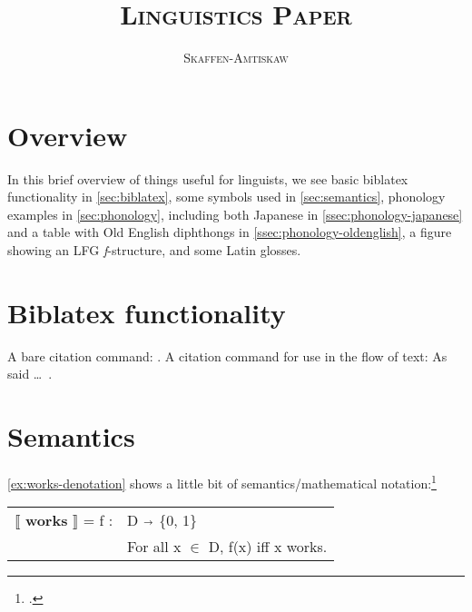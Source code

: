 \documentclass[a4paper,12pt,twoside]{article}
\newcommand{\thistitle}{\textsc{Linguistics Paper}}
\newcommand{\thisauthor}{\textsc{Skaffen-Amtiskaw}}
\begin{document}

\tableofcontents
\thispagestyle{toc}
\newpage

\listoffigures
\thispagestyle{lof}
\newpage

\listoftables
\thispagestyle{lot}
\newpage

\title{\thistitle}
\author{\thisauthor}

\maketitle
\thispagestyle{plain}

\section{Overview}

In this brief overview of things useful for linguists, we see basic biblatex
functionality in \autoref{sec:biblatex}, some symbols used in
\autoref{sec:semantics}, phonology examples in \autoref{sec:phonology},
including both Japanese in \autoref{ssec:phonology-japanese} and a table with
Old English diphthongs in \autoref{ssec:phonology-oldenglish}, a figure showing
an LFG \textit{f}-structure, and some Latin glosses.

\section{Biblatex functionality}
\label{sec:biblatex}

A bare citation command: \autocite{burgess-plunkett-2013-1}. A citation command
for use in the flow of text: As \textcite{burgess-plunkett-2013-1} said \dots~.

\section{Semantics}
\label{sec:semantics}

\autoref{ex:works-denotation} shows a little bit of semantics/mathematical
notation:\footcite[15]{heim-kratzer-1998}

\begin{exe}
  \ex\label{ex:works-denotation}

  \leavevmode\vadjust{\vspace{-\baselineskip}}

  \begin{tabular}[c]{l l}
    $\llbracket$ \textbf{works} $\rrbracket$ = f : & D $\shortrightarrow$ \{0, 1\} \\
                                                   & For all x $\in$ D, f(x) iff x works.  \\
  \end{tabular}

\end{exe}
\end{document}
